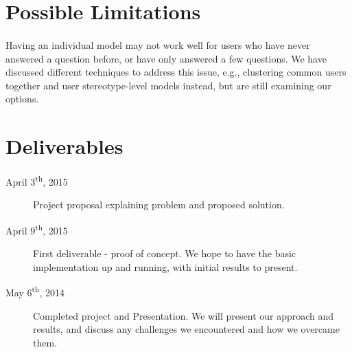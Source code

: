\documentclass[letterpaper]{article}
\begin{document}
\section*{Possible Limitations}

\paragraph{} Having an individual model may not work well for users who have never answered a question before, or have only answered a few questions. We have discussed different techniques to address this issue, e.g., clustering common users together and user stereotype-level models instead, but are still examining our options.

\section*{Deliverables}

\begin{description}
\item[April 3\textsuperscript{th}, 2015] Project proposal explaining problem and proposed solution.

\item[April 9\textsuperscript{th}, 2015] First deliverable - proof of concept. We hope to have the basic implementation up and running, with initial results to present.

\item[May 6\textsuperscript{th}, 2014] Completed project and Presentation. We will present our approach and results, and discuss any challenges we encountered and how we overcame them.

\end{description}
\end{document}
